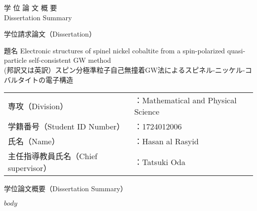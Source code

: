 \documentclass[
11pt, %
a4paper, %
oneside, %
BCOR5mm, %
]{article}
\theoremstyle{definition} %
\theoremstyle{plain} %
\theoremstyle{remark} %
\begin{document}
\begin{center}
\centering
\huge
学  位  論  文  概  要 \\
Dissertation Summary
\end{center}

学位請求論文（Dissertation）
  \vspace{0.5cm}

{
題名  Electronic structures of spinel nickel cobaltite from a spin-polarized quasi-particle self-consistent GW method \\
(邦訳又は英訳）スピン分極準粒子自己無撞着GW法によるスピネル-ニッケル-コバルタイトの電子構造
  \vspace{1.0cm}
  }


\hspace{2cm}
\begin{tabular}{ll}
専攻（Division）& ：Mathematical and Physical Science \\
学籍番号（Student ID Number）& ：1724012006 \\
氏名（Name）& ：Hasan al Rasyid \\
主任指導教員氏名（Chief supervisor）& ：Tatsuki Oda
\end{tabular}
  \vspace{0.5cm}

学位論文概要（Dissertation Summary）

\renewcommand{\topfraction}{1}
\renewcommand{\bottomfraction}{0.85}
\renewcommand{\textfraction}{0.15}
\renewcommand{\floatpagefraction}{0.8}
\renewcommand{\textfraction}{0.1}
\setlength{\floatsep}{5pt plus 2pt minus 2pt}
\setlength{\textfloatsep}{5pt plus 2pt minus 2pt}
\setlength{\intextsep}{5pt plus 2pt minus 2pt}
$body$
%

%
\end{document}
